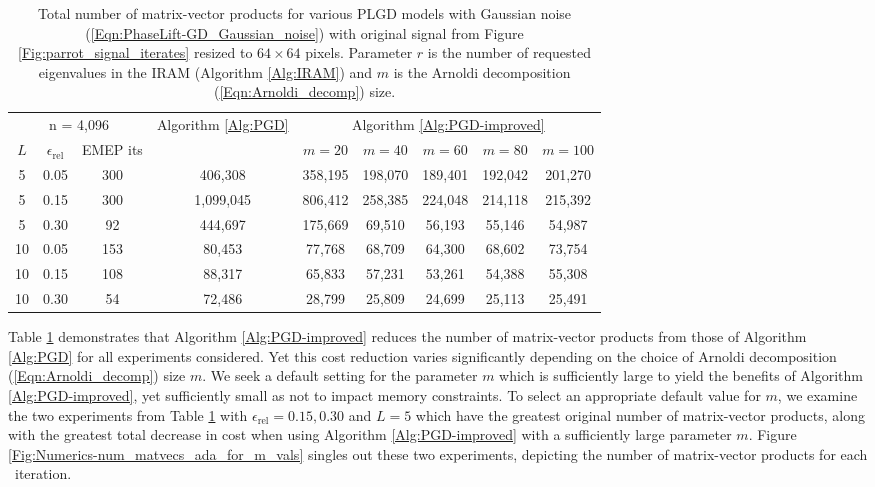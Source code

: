 \begin{table}[H]
\centering
\begin{tabular}{ |ccc|c|ccccc| }
 \hline
			  \multicolumn{3}{|c|}{n = 4,096} & Algorithm \ref{Alg:PGD}
			&  \multicolumn{5}{c|}{Algorithm \ref{Alg:PGD-improved}}	\\
$L$ & $\epsilon_\text{rel}$ & EMEP its & 	& $m=20$  & $m=40$  & $m=60$  & $m=80$  & $m=100$   \\
 \hline
  5 &  0.05 & 300 &  406,308  &  358,195  &  198,070  &  189,401  &  192,042  &  201,270  \\ 
  5 &  0.15 & 300 & 1,099,045  &  806,412  &  258,385  &  224,048  &  214,118  &  215,392  \\ 
  5 &  0.30 &  92 &  444,697  &  175,669  &   69,510  &   56,193  &   55,146  &   54,987  \\ 
 10 &  0.05 & 153 &   80,453  &   77,768  &   68,709  &   64,300  &   68,602  &   73,754  \\ 
 10 &  0.15 & 108 &   88,317  &   65,833  &   57,231  &   53,261  &   54,388  &   55,308  \\ 
 10 &  0.30 &  54 &   72,486  &   28,799  &   25,809  &   24,699  &   25,113  &   25,491  \\ 
 \hline
\end{tabular}

\caption{
Total number of matrix-vector products for various PLGD models with Gaussian noise	(\ref{Eqn:PhaseLift-GD_Gaussian_noise}) with original signal from Figure \ref{Fig:parrot_signal_iterates} resized to $64 \times 64$ pixels.
Parameter $r$ is the number of requested eigenvalues in the IRAM (Algorithm \ref{Alg:IRAM}) and $m$ is the Arnoldi decomposition (\ref{Eqn:Arnoldi_decomp}) size. 
} \label{Tab:Numerics-num_matvecs_orig_vs_ada}
\end{table}



Table \ref{Tab:Numerics-num_matvecs_orig_vs_ada} demonstrates that Algorithm \ref{Alg:PGD-improved} reduces the number of matrix-vector products from those of Algorithm \ref{Alg:PGD} for all experiments considered.
Yet this cost reduction varies significantly depending on the choice of Arnoldi decomposition (\ref{Eqn:Arnoldi_decomp}) size $m$.
We seek a default setting for the parameter $m$ which is sufficiently large to yield the benefits of Algorithm \ref{Alg:PGD-improved}, yet sufficiently small as not to impact memory constraints.
To select an appropriate default value for $m$, we examine the two experiments from Table \ref{Tab:Numerics-num_matvecs_orig_vs_ada} with $\epsilon_\text{rel} = 0.15, 0.30$ and $L=5$ which have the greatest original number of matrix-vector products, along with the greatest total decrease in cost when using Algorithm \ref{Alg:PGD-improved} with a sufficiently large parameter $m$.
Figure \ref{Fig:Numerics-num_matvecs_ada_for_m_vals} singles out these two experiments, depicting the number of matrix-vector products for each \emep \ iteration.

